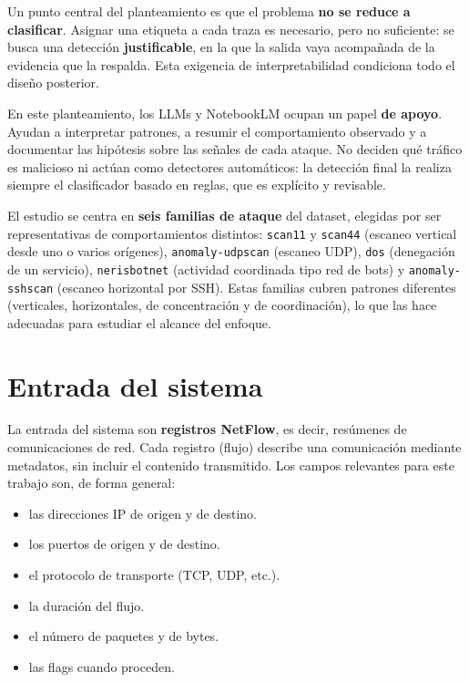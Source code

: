 Un punto central del planteamiento es que el problema \textbf{no se reduce a clasificar}. Asignar una etiqueta a cada traza es necesario, pero no suficiente: se busca una detección \textbf{justificable}, en la que la salida vaya acompañada de la evidencia que la respalda. Esta exigencia de interpretabilidad condiciona todo el diseño posterior.

En este planteamiento, los LLMs y NotebookLM ocupan un papel \textbf{de apoyo}. Ayudan a interpretar patrones, a resumir el comportamiento observado y a documentar las hipótesis sobre las señales de cada ataque. No deciden qué tráfico es malicioso ni actúan como detectores automáticos: la detección final la realiza siempre el clasificador basado en reglas, que es explícito y revisable.

El estudio se centra en \textbf{seis familias de ataque} del dataset, elegidas por ser representativas de comportamientos distintos: \texttt{scan11} y \texttt{scan44} (escaneo vertical desde uno o varios orígenes), \texttt{anomaly-udpscan} (escaneo UDP), \texttt{dos} (denegación de un servicio), \texttt{nerisbotnet} (actividad coordinada tipo red de bots) y \texttt{anomaly-sshscan} (escaneo horizontal por SSH). Estas familias cubren patrones diferentes (verticales, horizontales, de concentración y de coordinación), lo que las hace adecuadas para estudiar el alcance del enfoque.

\section{Entrada del sistema}
\label{sec:prob_entrada}

La entrada del sistema son \textbf{registros NetFlow}, es decir, resúmenes de comunicaciones de red. Cada registro (flujo) describe una comunicación mediante metadatos, sin incluir el contenido transmitido. Los campos relevantes para este trabajo son, de forma general:

\begin{itemize}
  \item las direcciones IP de origen y de destino.
  \item los puertos de origen y de destino.
  \item el protocolo de transporte (TCP, UDP, etc.).
  \item la duración del flujo.
  \item el número de paquetes y de bytes.
  \item las flags cuando proceden.
\end{itemize}

